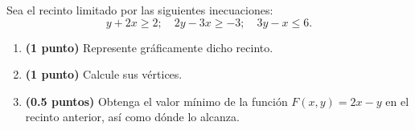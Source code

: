 
Sea el recinto limitado por las siguientes inecuaciones:
\[
y+2x\geq2;\quad 2y-3x\geq-3;\quad 3y-x\leq6.
\]
\begin{enumerate}[label=\alph*)]
\item \textbf{(1 punto)} Represente gráficamente dicho recinto.
\item \textbf{(1 punto)} Calcule sus vértices.
\item \textbf{(0.5 puntos)} Obtenga el valor mínimo de la función $F(x,y)=2x-y$ en el recinto anterior, así como dónde lo alcanza.
\end{enumerate}
